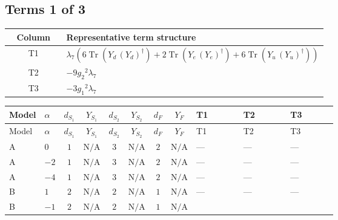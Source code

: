 \documentclass[8pt]{article}
\begin{document}
\begin{landscape}
\subsection*{Terms 1 of 3}
\begin{center}
\begin{tabular}{@{}c >{\raggedright\arraybackslash}p{0.82\linewidth}@{}}
\toprule
Column & Representative term structure \\
\midrule
T1 & \(\displaystyle {\lambda_{7}} (6 \operatorname{Tr}\!\left({Y_d}\,\left({Y_d}\right)^{\dagger}\right)+2 \operatorname{Tr}\!\left({Y_e}\,\left({Y_e}\right)^{\dagger}\right)+6 \operatorname{Tr}\!\left({Y_u}\,\left({Y_u}\right)^{\dagger}\right))\) \\
\midrule
T2 & \(\displaystyle -9 {g_2}^2 {\lambda_{7}}\) \\
\midrule
T3 & \(\displaystyle -3 {g_1}^2 {\lambda_{7}}\) \\
\midrule
\bottomrule
\end{tabular}
\end{center}
\smallskip
\tiny
\begin{longtable}{@{}llcccccc >{\raggedright\arraybackslash}p{0.21\linewidth} >{\raggedright\arraybackslash}p{0.21\linewidth} >{\raggedright\arraybackslash}p{0.21\linewidth}@{}}
\toprule
Model & $\alpha$ & $d_{S_1}$ & $Y_{S_1}$ & $d_{S_2}$ & $Y_{S_2}$ & $d_F$ & $Y_F$ & T1 & T2 & T3 \\
\midrule
\endfirsthead
\toprule
Model & $\alpha$ & $d_{S_1}$ & $Y_{S_1}$ & $d_{S_2}$ & $Y_{S_2}$ & $d_F$ & $Y_F$ & T1 & T2 & T3 \\
\midrule
\endhead
A & $0$ & $1$ & $\text{N/A}$ & $3$ & $\text{N/A}$ & $2$ & $\text{N/A}$ & --- & --- & --- \\
\midrule
A & $-2$ & $1$ & $\text{N/A}$ & $3$ & $\text{N/A}$ & $2$ & $\text{N/A}$ & --- & --- & --- \\
\midrule
A & $-4$ & $1$ & $\text{N/A}$ & $3$ & $\text{N/A}$ & $2$ & $\text{N/A}$ & --- & --- & --- \\
\midrule
B & $1$ & $2$ & $\text{N/A}$ & $2$ & $\text{N/A}$ & $1$ & $\text{N/A}$ & --- & --- & --- \\
\midrule
B & $-1$ & $2$ & $\text{N/A}$ & $2$ & $\text{N/A}$ & $1$ & $\text{N/A}$ & \scriptsize\adjustbox{max width=\linewidth}{$\begin{gathered} {\lambda_{7}} (6 \operatorname{Tr}\!\left({Y_d}\,\left({Y_d}\right)^{\dagger}\right)+2 \operatorname{Tr}\!\left({Y_e}\,\left({Y_e}\right)^{\dagger}\right)+6 \operatorname{Tr}\!\left({Y_u}\,\left({Y_u}\right)^{\dagger}\right))\end{gathered}$} & \scriptsize\adjustbox{max width=\linewidth}{$\begin{gathered} -9 {g_2}^2 {\lambda_{7}}\end{gathered}$} & \scriptsize\adjustbox{max width=\linewidth}{$\begin{gathered} -3 {g_1}^2 {\lambda_{7}}\end{gathered}$} \\

\end{longtable}
\end{landscape}
\end{document}
